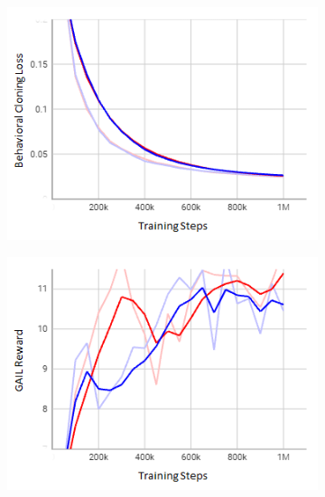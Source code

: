 \documentclass[letterpaper, 10 pt, conference]{ieeeconf}  %
\begin{document}
	\begin{figure}[t]
		\centering
		\begin{subfigure}[b]{0.16\linewidth}
			\centering
			\includegraphics[width=\linewidth]{Fig9a.png}
			\caption{}
			\label{fig9a}
		\end{subfigure}
		\hfill
		\begin{subfigure}[b]{0.16\linewidth}
			\centering
			\includegraphics[width=\linewidth]{Fig9b.png}
			\caption{}
			\label{fig9b}
		\end{subfigure}
		\hfill
		\begin{subfigure}[b]{0.16\linewidth}
			\centering

\end{subfigure}
\end{figure}
\end{document}
